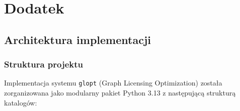 \chapter{Dodatek}\label{chap:appendix}

\section{Architektura implementacji}

\subsection{Struktura projektu}

Implementacja systemu \texttt{glopt} (Graph Licensing Optimization) została zorganizowana jako modularny pakiet Python 3.13 z następującą strukturą katalogów:

